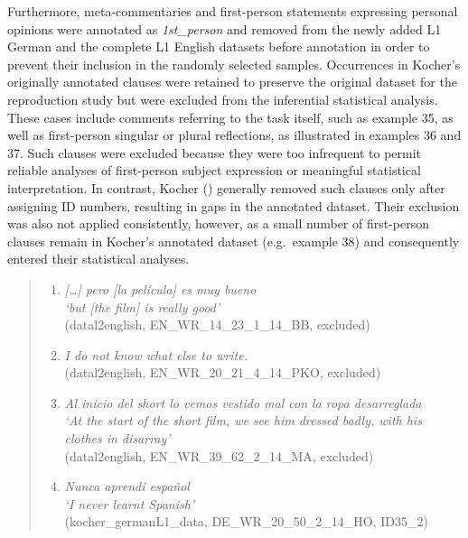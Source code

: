 \documentclass[
  letterpaper,
  DIV=11,
  numbers=noendperiod]{scrartcl}
\providecommand{\tightlist}{%
  \setlength{\itemsep}{0pt}\setlength{\parskip}{0pt}}
\begin{document}
Furthermore, meta-commentaries and first-person statements expressing
personal opinions were annotated as \emph{1st\_person} and removed from
the newly added L1 German and the complete L1 English datasets before
annotation in order to prevent their inclusion in the randomly selected
samples. Occurrences in Kocher's originally annotated clauses were
retained to preserve the original dataset for the reproduction study but
were excluded from the inferential statistical analysis. These cases
include comments referring to the task itself, such as example 35, as
well as first-person singular or plural reflections, as illustrated in
examples 36 and 37. Such clauses were excluded because they were too
infrequent to permit reliable analyses of first-person subject
expression or meaningful statistical interpretation. In contrast, Kocher
() generally removed such
clauses only after assigning ID numbers, resulting in gaps in the
annotated dataset. Their exclusion was also not applied consistently,
however, as a small number of first-person clauses remain in Kocher's
annotated dataset (e.g.~example 38) and consequently entered their
statistical analyses.

\begin{quote}
\begin{enumerate}
\def\labelenumi{\arabic{enumi}.}
\setcounter{enumi}{34}
\tightlist
\item
  \emph{{[}\ldots{]} pero {[}la película{]} es muy bueno\\
  `\emph{but {[}the film{]} is really good}'}\\
  (datal2english, EN\_WR\_14\_23\_1\_14\_BB, excluded)
\item
  \emph{I do not know what else to write.}\\
  (datal2english, EN\_WR\_20\_21\_4\_14\_PKO, excluded)
\item
  \emph{Al inicio del short lo vemos vestido mal con la ropa
  desarreglada\\
  `\emph{At the start of the short film, we see him dressed badly, with
  his clothes in disarray}'}\\
  (datal2english, EN\_WR\_39\_62\_2\_14\_MA, excluded)
\item
  \emph{Nunca aprendí español\\
  `\emph{I never learnt Spanish}'}\\
  (kocher\_germanL1\_data, DE\_WR\_20\_50\_2\_14\_HO, ID35\_2)
\end{enumerate}
\end{quote}
\end{document}
